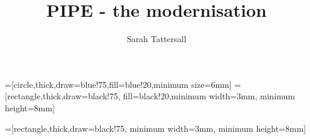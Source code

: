 \title{PIPE - the modernisation}
\author{Sarah Tattersall}

  =[circle,thick,draw=blue!75,fill=blue!20,minimum size=6mm]
  =[rectangle,thick,draw=black!75,
              fill=black!20,minimum width=3mm, minimum height=8mm]

  =[rectangle,thick,draw=black!75,
              minimum width=3mm, minimum height=8mm]

